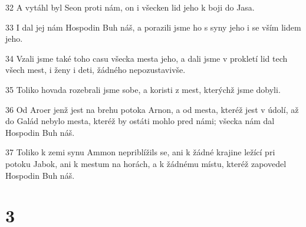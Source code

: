 \par 32 A vytáhl byl Seon proti nám, on i všecken lid jeho k boji do Jasa.
\par 33 I dal jej nám Hospodin Buh náš, a porazili jsme ho s syny jeho i se vším lidem jeho.
\par 34 Vzali jsme také toho casu všecka mesta jeho, a dali jsme v prokletí lid tech všech mest, i ženy i deti, žádného nepozustavivše.
\par 35 Toliko hovada rozebrali jsme sobe, a koristi z mest, kterýchž jsme dobyli.
\par 36 Od Aroer jenž jest na brehu potoka Arnon, a od mesta, kteréž jest v údolí, až do Galád nebylo mesta, kteréž by ostáti mohlo pred námi; všecka nám dal Hospodin Buh náš.
\par 37 Toliko k zemi synu Ammon nepriblížils se, ani k žádné krajine ležící pri potoku Jabok, ani k mestum na horách, a k žádnému místu, kteréž zapovedel Hospodin Buh náš.

\chapter{3}

